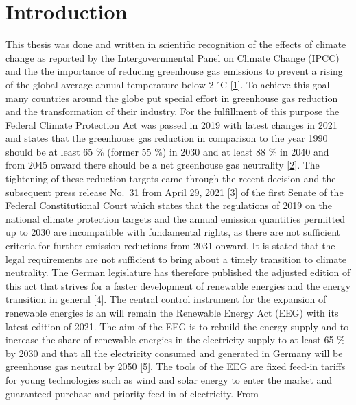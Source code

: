 \documentclass[a4paper,11pt]{article}
\begin{document}
\newpage
\listoftables
{}

\newpage
\pagestyle{plain}       
\setcounter{page}{1}    %

\hypertarget{introduction}{%
\section{Introduction}\label{introduction}}

This thesis was done and written in scientific recognition of the effects of climate change as reported by the Intergovernmental Panel on Climate Change (IPCC) and the the importance of reducing greenhouse gas emissions to prevent a rising of the global average annual temperature below 2 \(^\circ\)C {[}\protect\hyperlink{ref-IntergovernmentalPanelonClimateChange.2014}{1}{]}. To achieve this goal many countries around the globe put special effort in greenhouse gas reduction and the transformation of their industry. For the fulfillment of this purpose the Federal Climate Protection Act was passed in 2019 with latest changes in 2021 and states that the greenhouse gas reduction in comparison to the year 1990 should be at least 65 \% (former 55 \%) in 2030 and at least 88 \% in 2040 and from 2045 onward there should be a net greenhouse gas neutrality {[}\protect\hyperlink{ref-BundesamtfurJustiz.2019}{2}{]}. The tightening of these reduction targets came through the recent decision and the subsequent press release No.~31 from April 29, 2021 {[}\protect\hyperlink{ref-Bundesverfassungsgericht.24.03.2021}{3}{]} of the first Senate of the Federal Constitutional Court which states that the regulations of 2019 on the national climate protection targets and the annual emission quantities permitted up to 2030 are incompatible with fundamental rights, as there are not sufficient criteria for further emission reductions from 2031 onward. It is stated that the legal requirements are not sufficient to bring about a timely transition to climate neutrality. The German legislature has therefore published the adjusted edition of this act that strives for a faster development of renewable energies and the energy transition in general {[}\protect\hyperlink{ref-BundesministeriumfurUmweltNaturschutzundnukleareSicherheit.12.05.2021}{4}{]}. The central control instrument for the expansion of renewable energies is an will remain the Renewable Energy Act (EEG) with its latest edition of 2021. The aim of the EEG is to rebuild the energy supply and to increase the share of renewable energies in the electricity supply to at least 65 \% by 2030 and that all the electricity consumed and generated in Germany will be greenhouse gas neutral by 2050 {[}\protect\hyperlink{ref-BundesamtfurJustiz.2021}{5}{]}. The tools of the EEG are fixed feed-in tariffs for young technologies such as wind and solar energy to enter the market and guaranteed purchase and priority feed-in of electricity. From 
\end{document}

